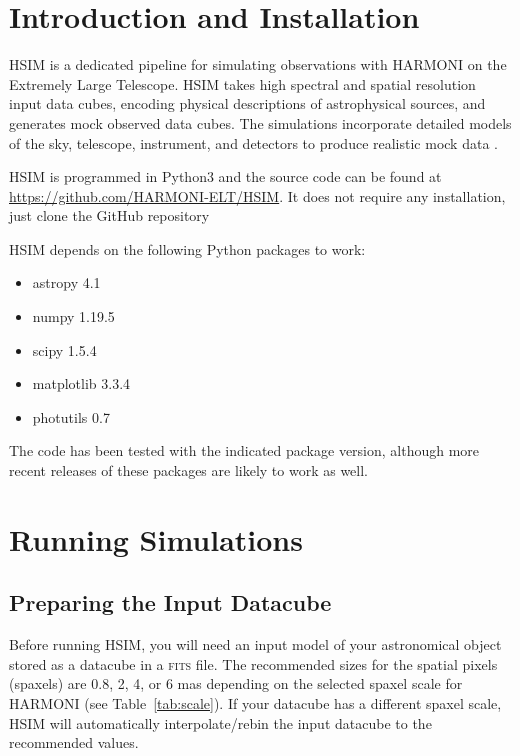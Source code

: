 \documentclass[12pt]{report}
\begin{document}
\section{Introduction and Installation}

HSIM is a dedicated pipeline for simulating observations with HARMONI on the Extremely Large Telescope. HSIM takes high spectral and spatial resolution input data cubes, encoding physical descriptions of astrophysical sources, and generates mock observed data cubes. The simulations incorporate detailed models of the sky, telescope, instrument, and detectors to produce realistic mock data \citep{Zieleniewski2015}.

HSIM is programmed in Python3 and the source code can be found at \url{https://github.com/HARMONI-ELT/HSIM}. It does not require any installation, just clone the GitHub repository 


HSIM depends on the following Python packages to work:

\begin{itemize}
\setlength\itemsep{-0.5ex}
\item astropy 4.1
\item numpy 1.19.5
\item scipy 1.5.4
\item matplotlib 3.3.4
\item photutils 0.7
\end{itemize}

The code has been tested with the indicated package version, although more recent releases of these packages are likely to work as well.


\section{Running Simulations}

\subsection{Preparing the Input Datacube}

Before running HSIM, you will need an input model of your astronomical object stored as a datacube in a \textsc{fits} file. The recommended sizes for the spatial pixels (spaxels) are 0.8, 2, 4, or 6 mas depending on the selected spaxel scale for HARMONI (see Table~\ref{tab:scale}). If your datacube has a different spaxel scale, HSIM will automatically interpolate\slash rebin the input datacube to the recommended values.
\end{document}
